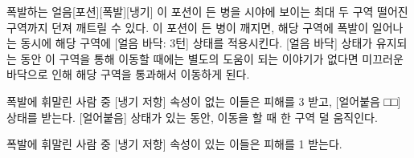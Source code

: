 \documentclass{report}
\begin{document}
	\begin{story}{폭발하는 얼음}{[포션][폭발][냉기]}
		이 포션이 든 병을 시야에 보이는 최대 두 구역 떨어진 구역까지 던져 깨트릴 수 있다. 이 포션이 든 병이 깨지면, 해당 구역에 폭발이 일어나는 동시에 해당 구역에 [얼음 바닥: 3턴] 상태를 적용시킨다. [얼음 바닥] 상태가 유지되는 동안 이 구역을 통해 이동할 때에는 별도의 도움이 되는 이야기가 없다면 미끄러운 바닥으로 인해 해당 구역을 통과해서 이동하게 된다.
		
		\smallskip
		
		폭발에 휘말린 사람 중 [냉기 저항] 속성이 없는 이들은 피해를 3 받고, [얼어붙음 □□] 상태를 받는다. [얼어붙음] 상태가 있는 동안, 이동을 할 때 한 구역 덜 움직인다.
		
		\smallskip
		
		폭발에 휘말린 사람 중 [냉기 저항] 속성이 있는 이들은 피해를 1 받는다.
		
	\end{story}
\end{document}
